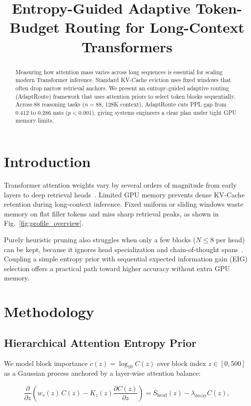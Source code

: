 \documentclass[11pt]{article}
\title{Entropy-Guided Adaptive Token-Budget Routing for Long-Context Transformers}
\begin{document}
\maketitle

\begin{abstract}
Measuring how attention mass varies across long sequences is essential for scaling modern Transformer inference. Standard KV-Cache eviction uses fixed windows that often drop narrow retrieval anchors. We present an entropy-guided adaptive routing (AdaptRoute) framework that uses attention priors to select token blocks sequentially. Across 88 reasoning tasks ($n = 88$, 128K context), AdaptRoute cuts PPL gap from 0.412 to 0.286 nats ($p < 0.001$), giving systems engineers a clear plan under tight GPU memory limits.
\end{abstract}

\section{Introduction}
\label{sec:intro}

Transformer attention weights vary by several orders of magnitude from early layers to deep retrieval heads~\cite{vaswani2017neurips,dao2022neurips}. Limited GPU memory prevents dense KV-Cache retention during long-context inference. Fixed uniform or sliding windows waste memory on flat filler tokens and miss sharp retrieval peaks, as shown in Fig.~\ref{fig:profile_overview}.

Purely heuristic pruning also struggles when only a few blocks ($N \le 8$ per head) can be kept, because it ignores head specialization and chain-of-thought spans~\cite{wei2022neurips}. Coupling a simple entropy prior with sequential expected information gain (EIG) selection offers a practical path toward higher accuracy without extra GPU memory.

\section{Methodology}
\label{sec:method}

\subsection{Hierarchical Attention Entropy Prior}
We model block importance $c(z) = \log_{10} C(z)$ over block index $z \in [0, 500]$ as a Gaussian process anchored by a layer-wise attention balance:

\begin{equation}
\label{eq:transport}
\frac{\partial}{\partial z}\!\left(w_s(z)\, C(z) - K_z(z)\frac{\partial C(z)}{\partial z}\right) = S_{\text{head}}(z) - \lambda_{\text{decay}} C(z),
\end{equation}
\end{document}
